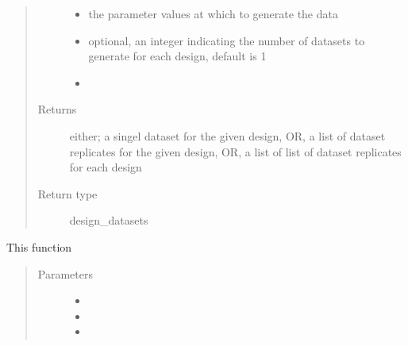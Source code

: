 \documentclass[letterpaper,10pt,english,openany,oneside]{sphinxmanual}
\begin{document}
\begin{fulllineitems}
\begin{fulllineitems}
\begin{quote}
\begin{description}
\begin{itemize}
\item {} 
 \textendash{} the parameter values at which to generate the data

\item {} 
 \textendash{} optional,  an integer indicating the number of datasets to generate for each design,  default is 1

\item {} 
 \textendash{} 

\end{itemize}

\item[{Returns}] \leavevmode
either; a singel dataset for the given design,  OR,  a list of dataset replicates for the given design,  OR,  a list of list of dataset replicates for each design

\item[{Return type}] \leavevmode
design\_datasets

\end{description}\end{quote}

\end{fulllineitems}


\begin{fulllineitems}
\label{\detokenize{nloed:nloed.model.Model.predict}}
This function
\begin{quote}\begin{description}
\item[{Parameters}] \leavevmode\begin{itemize}
\item {} 
 \textendash{} 

\item {} 
 \textendash{} 

\item {} 
 \textendash{} 


\end{itemize}
\end{description}
\end{quote}
\end{fulllineitems}
\end{fulllineitems}
\end{document}
